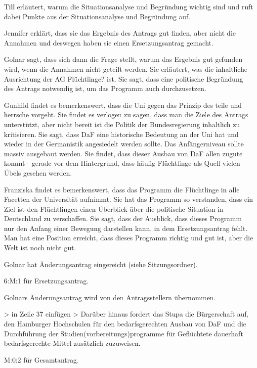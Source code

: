 \documentclass[ngerman,headheight=70pt]{scrartcl}
\begin{document}
    Till erläutert, warum die Situationsanalyse und Begründung wichtig sind und
    ruft dabei Punkte aus der Situationsanalyse und Begründung auf.

    Jennifer erklärt, dass sie das Ergebnis des Antrags gut finden, aber nicht
    die Annahmen und deswegen haben sie einen Ersetzungsantrag gemacht.

    Golnar sagt, dass sich dann die Frage stellt, warum das Ergebnis gut gefunden
    wird, wenn die Annahmen nicht geteilt werden. Sie erläutert, was die inhaltliche
    Ausrichtung der AG Flüchtlinge? ist. Sie sagt, dass eine politische Begründung
    des Antrags notwendig ist, um das Programm auch durchzusetzen.

    Gunhild findet es bemerkenswert, dass die Uni gegen das Prinzip des teile
    und herrsche vorgeht. Sie findet es verlogen zu sagen, dass man die Ziele
    des Antrags unterstützt, aber nicht bereit ist die Politik der Bundesregierung
    inhaltlich zu kritisieren. Sie sagt, dass DaF eine historische Bedeutung
    an der Uni hat und wieder in der Germanistik angesiedelt werden sollte.
    Das Anfängerniveau sollte massiv ausgebaut werden. Sie findet, dass dieser
    Ausbau von DaF allen zugute kommt - gerade vor dem Hintergrund, dass häufig
    Flüchtlinge als Quell vielen Übels gesehen werden.

    Franziska findet es bemerkenswert, dass das Programm die Flüchtlinge in alle
    Facetten der Universität aufnimmt. Sie hat das Programm so verstanden, dass
    ein Ziel ist den Flüchtlingen einen Überblick über die politische Situation
    in Deutschland zu verschaffen. Sie sagt, dass der Ausblick, dass dieses
    Programm nur den Anfang einer Bewegung darstellen kann, in dem Ersetzungsantrag
    fehlt. Man hat eine Position erreicht, dass dieses Programm richtig und gut ist,
    aber die Welt ist noch nicht gut.

    Golnar hat Änderungsantrag eingereicht (siehe Sitzungsordner).

    6:M:1 für Ersetzungsantrag.

    Golnars Änderungsantrag wird von den Antragsstellern übernommen.

    > in Zeile 37 einfügen
    > Darüber hinaus fordert das Stupa die Bürgerschaft auf, den Hamburger
    Hochschulen für den bedarfsgerechten Ausbau von DaF und die Durchführung
    der Studien(vorbereitungs)programme für Geflüchtete
    dauerhaft bedarfsgerechte Mittel zusätzlich zuzuweisen.

    M:0:2 für Gesamtantrag.
\end{document}
